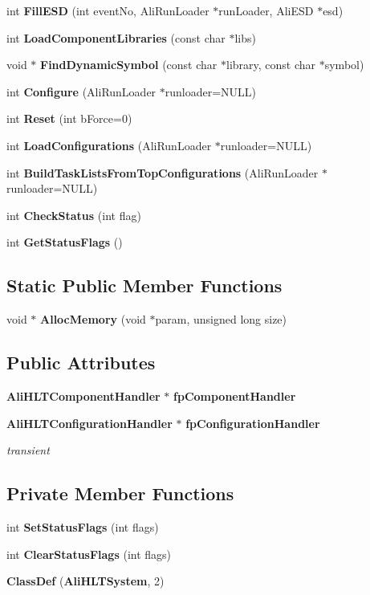 \begin{CompactItemize}
\item 
int {\bf Fill\-ESD} (int event\-No, Ali\-Run\-Loader $\ast$run\-Loader, Ali\-ESD $\ast$esd)
\item 
int {\bf Load\-Component\-Libraries} (const char $\ast$libs)
\item 
void $\ast$ {\bf Find\-Dynamic\-Symbol} (const char $\ast$library, const char $\ast$symbol)
\item 
int {\bf Configure} (Ali\-Run\-Loader $\ast$runloader=NULL)
\item 
int {\bf Reset} (int b\-Force=0)
\item 
int {\bf Load\-Configurations} (Ali\-Run\-Loader $\ast$runloader=NULL)
\item 
int {\bf Build\-Task\-Lists\-From\-Top\-Configurations} (Ali\-Run\-Loader $\ast$runloader=NULL)
\item 
int {\bf Check\-Status} (int flag)
\item 
int {\bf Get\-Status\-Flags} ()
\end{CompactItemize}
\subsection*{Static Public Member Functions}
\begin{CompactItemize}
\item 
void $\ast$ {\bf Alloc\-Memory} (void $\ast$param, unsigned long size)
\end{CompactItemize}
\subsection*{Public Attributes}
\begin{CompactItemize}
\item 
{\bf Ali\-HLTComponent\-Handler} $\ast$ {\bf fp\-Component\-Handler}
\item 
{\bf Ali\-HLTConfiguration\-Handler} $\ast$ {\bf fp\-Configuration\-Handler}
\begin{CompactList}\small\item\em transient \item\end{CompactList}\end{CompactItemize}
\subsection*{Private Member Functions}
\begin{CompactItemize}
\item 
int {\bf Set\-Status\-Flags} (int flags)
\item 
int {\bf Clear\-Status\-Flags} (int flags)
\item 
{\bf Class\-Def} ({\bf Ali\-HLTSystem}, 2)
\end{CompactItemize}
